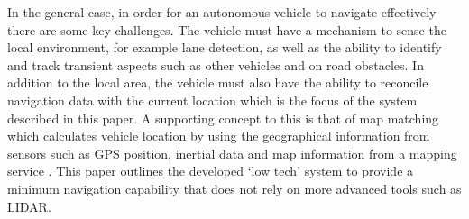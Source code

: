 \documentclass[]{aiaa-tc}%
\begin{document}
In the general case, in order for an autonomous vehicle to navigate effectively there are some key challenges. The vehicle must have a mechanism to sense the local environment, for example lane detection, as well as the ability to identify and track transient aspects such as other vehicles and on road obstacles. In addition to the local area, the vehicle must also have the ability to reconcile navigation data with the current location which is the focus of the system described in this paper. A supporting concept to this is that of map matching which calculates vehicle location by using the geographical information from sensors such as GPS position, inertial data and map information from a mapping service \citep{keyTechSelfDriving}. This paper outlines the developed `low tech' system to provide a minimum navigation capability that does not rely on more advanced tools such as LIDAR. 
\end{document}
